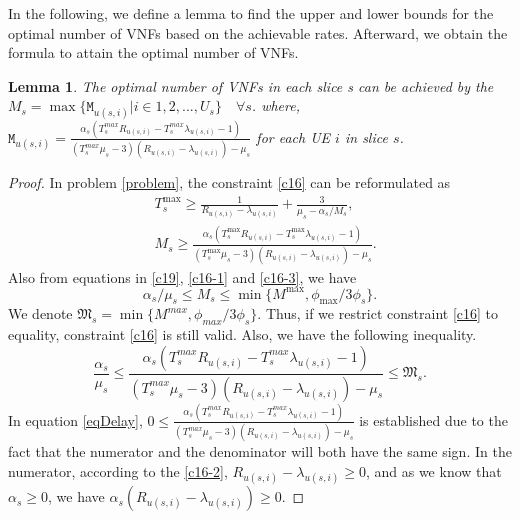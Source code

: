 \documentclass[lettersize,journal]{IEEEtran}
\newtheorem{lemma}{Lemma}
\begin{document}
In the following, we define a lemma to find the upper and lower bounds for the optimal number of VNFs based on the achievable rates. Afterward, we obtain the formula to attain the optimal number of VNFs.
\begin{lemma}\label{lemma1}
The optimal number of VNFs in each slice s can be achieved by the
$M_s = \max\{\mathtt{M}_{u(s,i)} | i \in 1,2,..., U_s\} \quad \forall s$.
where, $\mathtt{M}_{u(s,i)} = \frac{\alpha_s(T^{max}_s R_{u(s,i)}-T^{max}_s\lambda_{u(s,i)} -1)}{(T^{max}_s\mu_s-3)(R_{u(s,i)}-\lambda_{u(s,i)}) - \mu_s }$ for each UE $i$ in slice $s$.
\end{lemma}
\begin{proof}
In problem \eqref{problem}, the constraint \eqref{c16} can be reformulated as
\begin{subequations}
\begin{alignat}{4}
&T^{\max}_s \geq\frac{1}{R_{u(s,i)} - \lambda_{u(s,i)}} + \frac{3}{\mu_s - \alpha_{s}/{M_s}},  \\
&M_s \geq \frac{\alpha_s(T^{\max}_s R_{u(s,i)}-T^{\max}_s\lambda_{u(s,i)} -1)}{(T^{\max}_s\mu_s-3)(R_{u(s,i)}-\lambda_{u(s,i)}) - \mu_s }.
\end{alignat}
\end{subequations}
Also from equations in \eqref{c19}, \eqref{c16-1} and \eqref{c16-3}, we have
\begin{equation}
\alpha_s/\mu_s\leq M_s \leq \min\{M^{\max}, \phi_{\max}/{3\phi_s}\}.
\end{equation}
We denote $ \mathfrak{M}_s= \min\{M^{max}, \phi_{max}/{3\phi_s}\}$.
Thus, if we restrict constraint \eqref{c16} to equality, constraint \eqref{c16} is still valid.
Also, we have the following inequality.
\begin{equation}\label{eqDelay}
\frac{\alpha_s}{\mu_s} \leq \frac{\alpha_s(T^{max}_s R_{u(s,i)}-T^{max}_s\lambda_{u(s,i)} -1)}{(T^{max}_s\mu_s-3)(R_{u(s,i)}-\lambda_{u(s,i)}) - \mu_s } \leq \mathfrak{M}_s.
\end{equation}
In equation \eqref{eqDelay}, $0\leq \frac{\alpha_s(T^{max}_s R_{u(s,i)}-T^{max}_s\lambda_{u(s,i)} -1)}{(T^{max}_s\mu_s-3)(R_{u(s,i)}-\lambda_{u(s,i)}) - \mu_s }$ is established due to the fact that
the numerator and the denominator will both have the same sign.
In the numerator, according to the \eqref{c16-2}, $ R_{u(s,i)}-\lambda_{u(s,i)} \geq 0$, and as we know that $\alpha_s \geq 0$, we have $ \alpha_s (R_{u(s,i)}-\lambda_{u(s,i)}) \geq 0 $.

\end{proof}
\end{document}
